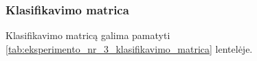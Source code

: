 \subsubsection{Klasifikavimo matrica}
\label{subsubsec:eksperimentas_nr_3_klasifikavimo_matrica}

Klasifikavimo matricą galima pamatyti \ref{tab:eksperimento_nr_3_klasifikavimo_matrica} lentelėje.

